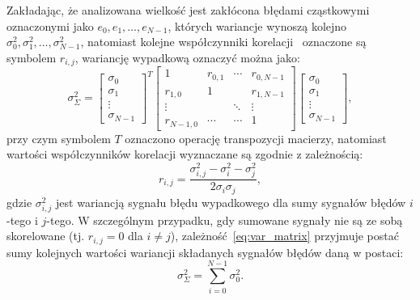 Zakładając, że analizowana wielkość jest zakłócona błędami cząstkowymi oznaczonymi jako $e_{0}, e_{1}, \hdots, e_{N-1}$, których wariancje wynoszą kolejno $\sigma_{0}^{2}, \sigma_{1}^{2}, \hdots, \sigma_{N-1}^{2}$, natomiast kolejne współczynniki korelacji~\cite{jcgm_guide} oznaczone są symbolem $r_{i,j}$, wariancję wypadkową oznaczyć można jako:
\begin{equation}
\sigma_{\Sigma}^{2} =
\begin{bmatrix}
\sigma_{0} \\ \sigma_{1} \\ \vdots \\ \sigma_{N-1}
\end{bmatrix}^{T}
\begin{bmatrix}
1         & r_{0,1} & \cdots & r_{0,N-1} \\
r_{1,0}   & 1       &        & r_{1,N-1} \\
\vdots    &         & \ddots & \vdots    \\
r_{N-1,0} & \cdots  & \cdots & 1
\end{bmatrix}
\begin{bmatrix}
\sigma_{0} \\ \sigma_{1} \\ \vdots \\ \sigma_{N-1}
\end{bmatrix}
\label{eq:var_matrix},
\end{equation}
przy czym symbolem $T$ oznaczono operację transpozycji macierzy, natomiast wartości współczynników korelacji wyznaczane są zgodnie z zależnością:
\begin{equation}
r_{i,j} = \frac{\sigma_{i,j}^{2} - \sigma_{i}^{2} - \sigma_{j}^{2}}{2 \sigma_{i} \sigma_{j}} \label{eq:var_corr},
\end{equation}
gdzie $\sigma_{i,j}^{2}$ jest wariancją sygnału błędu wypadkowego dla sumy sygnałów błędów $i$-tego i $j$-tego. W szczególnym przypadku, gdy sumowane sygnały nie są ze sobą skorelowane (tj. $r_{i,j} = 0$ dla $i \ne j$), zależność~\eqref{eq:var_matrix} przyjmuje postać sumy kolejnych wartości wariancji składanych sygnałów błędów daną w postaci:
\begin{equation}
\sigma_{\Sigma}^{2} = \sum _{i = 0} ^{N-1} \sigma_{0}^{2} \label{eq:var_sum}.
\end{equation}

